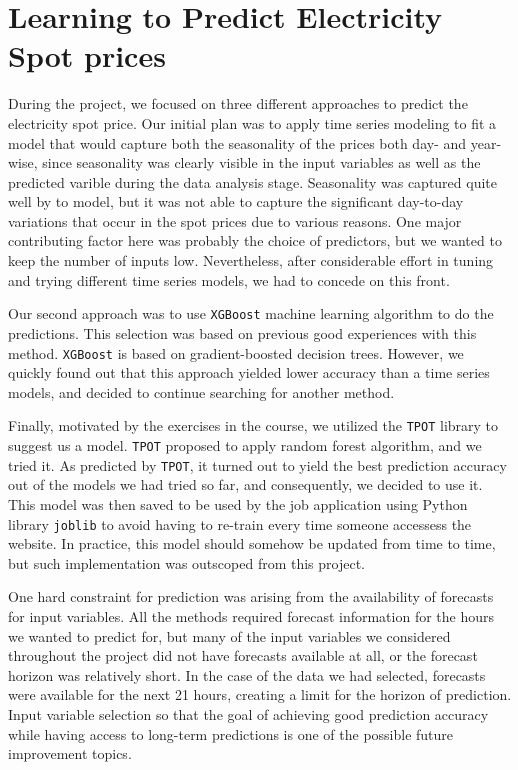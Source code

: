 \documentclass{article}
\numberwithin{equation}{section}
\begin{document}
\section{Learning to Predict Electricity Spot prices}
During the project, we focused on three different approaches to predict the electricity spot price. Our initial plan was to apply time series modeling to fit a model that would capture both the seasonality of the prices both day- and year-wise, since seasonality was clearly visible in the input variables as well as the predicted varible during the data analysis stage. Seasonality was captured quite well by to model, but it was not able to capture the significant day-to-day variations that occur in the spot prices due to various reasons. One major contributing factor here was probably the choice of predictors, but we wanted to keep the number of inputs low. Nevertheless, after considerable effort in tuning and trying different time series models, we had to concede on this front.

Our second approach was to use \verb|XGBoost| machine learning algorithm to do the predictions. This selection was based on previous good experiences with this method. \verb|XGBoost| is based on gradient-boosted decision trees. However, we quickly found out that this approach yielded lower accuracy than a time series models, and decided to continue searching for another method.

Finally, motivated by the exercises in the course, we utilized the \verb|TPOT| library to suggest us a model. \verb|TPOT| proposed to apply random forest algorithm, and we tried it. As predicted by \verb|TPOT|, it turned out to yield the best prediction accuracy out of the models we had tried so far, and consequently, we decided to use it. This model was then saved to be used by the job application using Python library \verb|joblib| to avoid having to re-train every time someone accessess the website. In practice, this model should somehow be updated from time to time, but such implementation was outscoped from this project.

One hard constraint for prediction was arising from the availability of forecasts for input variables. All the methods required forecast information for the hours we wanted to predict for, but many of the input variables we considered throughout the project did not have forecasts available at all, or the forecast horizon was relatively short. In the case of the data we had selected, forecasts were available for the next 21 hours, creating a limit for the horizon of prediction. Input variable selection so that the goal of achieving good prediction accuracy while having access to long-term predictions is one of the possible future improvement topics.
\end{document}
